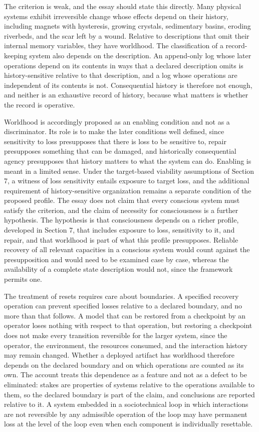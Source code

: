 \documentclass[11pt]{article}
\theoremstyle{definition}
\theoremstyle{plain}
\theoremstyle{remark}
\begin{document}
The criterion is weak, and the essay should state this directly. Many physical systems exhibit irreversible change whose effects depend on their history, including magnets with hysteresis, growing crystals, sedimentary basins, eroding riverbeds, and the scar left by a wound. Relative to descriptions that omit their internal memory variables, they have worldhood. The classification of a record-keeping system also depends on the description. An append-only log whose later operations depend on its contents in ways that a declared description omits is history-sensitive relative to that description, and a log whose operations are independent of its contents is not. Consequential history is therefore not enough, and neither is an exhaustive record of history, because what matters is whether the record is operative.

Worldhood is accordingly proposed as an enabling condition and not as a discriminator. Its role is to make the later conditions well defined, since sensitivity to loss presupposes that there is loss to be sensitive to, repair presupposes something that can be damaged, and historically consequential agency presupposes that history matters to what the system can do. Enabling is meant in a limited sense. Under the target-based viability assumptions of Section 7, a witness of loss sensitivity entails exposure to target loss, and the additional requirement of history-sensitive organization remains a separate condition of the proposed profile. The essay does not claim that every conscious system must satisfy the criterion, and the claim of necessity for consciousness is a further hypothesis. The hypothesis is that consciousness depends on a richer profile, developed in Section 7, that includes exposure to loss, sensitivity to it, and repair, and that worldhood is part of what this profile presupposes. Reliable recovery of all relevant capacities in a conscious system would count against the presupposition and would need to be examined case by case, whereas the availability of a complete state description would not, since the framework permits one.

The treatment of resets requires care about boundaries. A specified recovery operation can prevent specified losses relative to a declared boundary, and no more than that follows. A model that can be restored from a checkpoint by an operator loses nothing with respect to that operation, but restoring a checkpoint does not make every transition reversible for the larger system, since the operator, the environment, the resources consumed, and the interaction history may remain changed. Whether a deployed artifact has worldhood therefore depends on the declared boundary and on which operations are counted as its own. The account treats this dependence as a feature and not as a defect to be eliminated: stakes are properties of systems relative to the operations available to them, so the declared boundary is part of the claim, and conclusions are reported relative to it. A system embedded in a sociotechnical loop in which interactions are not reversible by any admissible operation of the loop may have permanent loss at the level of the loop even when each component is individually resettable.
\end{document}
